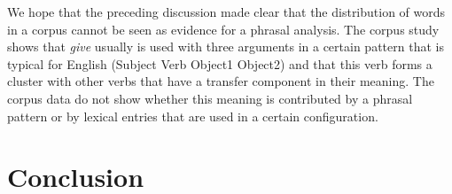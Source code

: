 \begin{exe}
\begin{xlist}[iv.]
\begin{exe}
\begin{xlist}[iv.]

\noindent
We hope that the preceding discussion made clear that the distribution of words in a corpus cannot
be seen as evidence for a phrasal analysis. The corpus study shows that \emph{give} usually is used
with three arguments in a certain pattern that is typical for English (Subject Verb Object1 Object2)
and that this verb forms a cluster with other verbs that have a transfer component in their meaning.
The corpus data do not show whether this meaning is contributed by a phrasal pattern or by lexical
entries that are used in a certain configuration.



\section{Conclusion}


%



\end{xlist}
\end{exe}
\end{xlist}
\end{exe}
